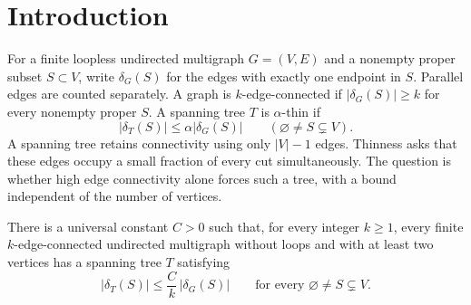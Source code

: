 \begin{abstract}
We prove that every finite loopless \(k\)-edge-connected multigraph on
at least two vertices, with \(k\ge1\), has a spanning tree meeting each
cut in at most \(C/k\) times the size of the cut,
where \(C\) is a universal constant.
This resolves the strong thin tree conjecture.
\end{abstract}

\section{Introduction}\label{sec:introduction}

For a finite loopless undirected multigraph \(G=(V,E)\) and a nonempty proper
subset \(S\subset V\), write \(\delta_G(S)\) for the edges with exactly
one endpoint in \(S\). Parallel edges are counted separately.
A graph is \(k\)-edge-connected if \(|\delta_G(S)|\ge k\) for
every nonempty proper \(S\).
A spanning tree \(T\) is \(\alpha\)-thin if
\[
 |\delta_T(S)|\le\alpha|\delta_G(S)|
 \qquad(\varnothing\ne S\subsetneq V).
\]
A spanning tree retains connectivity using only \(|V|-1\) edges.
Thinness asks that these edges occupy a small fraction of every cut
simultaneously. The question is whether high edge connectivity alone
forces such a tree, with a bound independent of the number of vertices.

\begin{theorem}\label{thm:main}
There is a universal constant \(C>0\) such that, for every integer
\(k\ge1\), every finite \(k\)-edge-connected undirected multigraph
without loops and with at least two vertices has a spanning tree \(T\)
satisfying
\[
 |\delta_T(S)|\le\frac Ck\,|\delta_G(S)|
 \qquad\text{for every }\varnothing\ne S\subsetneq V.
\]
\end{theorem}
